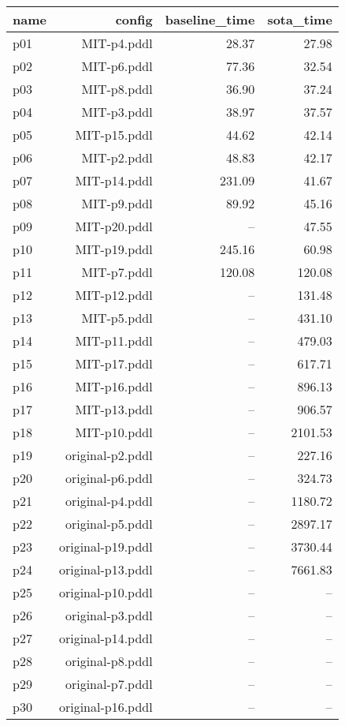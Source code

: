 \documentclass{article}
\begin{document}
                            \begin{center}
                            \scriptsize
                            \begin{tabular}{@{}l|r|r|r@{}}
                            name & config & baseline\_time & sota\_time\\\midrule
                              p01& MIT-p4.pddl&28.37&27.98\\
  p02& MIT-p6.pddl&77.36&32.54\\
  p03& MIT-p8.pddl&36.90&37.24\\
  p04& MIT-p3.pddl&38.97&37.57\\
  p05& MIT-p15.pddl&44.62&42.14\\
  p06& MIT-p2.pddl&48.83&42.17\\
  p07& MIT-p14.pddl&231.09&41.67\\
  p08& MIT-p9.pddl&89.92&45.16\\
  p09& MIT-p20.pddl&--&47.55\\
  p10& MIT-p19.pddl&245.16&60.98\\
  p11& MIT-p7.pddl&120.08&120.08\\
  p12& MIT-p12.pddl&--&131.48\\
  p13& MIT-p5.pddl&--&431.10\\
  p14& MIT-p11.pddl&--&479.03\\
  p15& MIT-p17.pddl&--&617.71\\
  p16& MIT-p16.pddl&--&896.13\\
  p17& MIT-p13.pddl&--&906.57\\
  p18& MIT-p10.pddl&--&2101.53\\
  p19& original-p2.pddl&--&227.16\\
  p20& original-p6.pddl&--&324.73\\
  p21& original-p4.pddl&--&1180.72\\
  p22& original-p5.pddl&--&2897.17\\
  p23& original-p19.pddl&--&3730.44\\
  p24& original-p13.pddl&--&7661.83\\
  p25& original-p10.pddl&--&--\\
  p26& original-p3.pddl&--&--\\
  p27& original-p14.pddl&--&--\\
  p28& original-p8.pddl&--&--\\
  p29& original-p7.pddl&--&--\\
  p30& original-p16.pddl&--&--
                            \end{tabular}
                            \end{center}
                    
\end{document}
